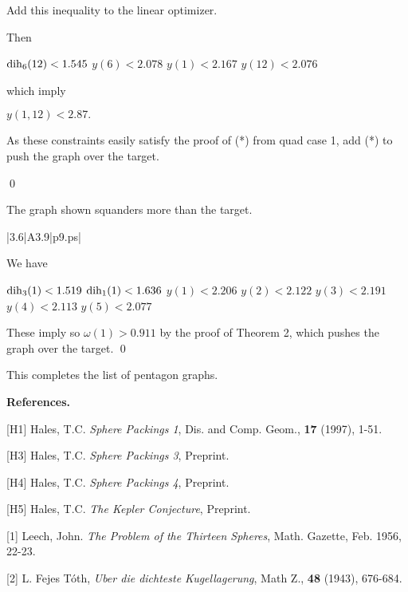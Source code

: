 Add this inequality to the linear optimizer.

Then

$\operatorname{dih}_6(12)<1.545$ \newline
$y(6)<2.078$ \newline
$y(1)<2.167$ \newline
$y(12)<2.076$ \newline

which imply

$y(1,12)<2.87.$ \newline

As these constraints easily satisfy the proof of (*) from
quad case 1, add (*) to push the graph over the target.

\qed

\bigskip

 The graph shown 
squanders more than the target.  \endproclaim

\gram|3.6|A3.9|p9.ps|  %


We have 

$\operatorname{dih}_3(1) < 1.519$ \newline
$\operatorname{dih}_1(1) < 1.636$ \newline
$y(1)<2.206$ \newline
$y(2)<2.122$ \newline
$y(3)<2.191$ \newline
$y(4)<2.113$ \newline
$y(5)<2.077$ \newline

These imply 
so $\omega(1)>0.911$ by the proof of Theorem 2, which pushes the graph over the target. \qed

\bigskip

This completes the list of pentagon graphs.


\bigskip



{\bf References.}

[H1] Hales, T.C. {\it Sphere Packings 1}, Dis. and Comp. Geom., 
{\bf 17} (1997), 1-51.

[H3] Hales, T.C. {\it Sphere Packings 3}, Preprint.

[H4] Hales, T.C. {\it Sphere Packings 4}, Preprint.

[H5] Hales, T.C. {\it The Kepler Conjecture}, Preprint.

[1] Leech, John.  {\it The Problem of the Thirteen Spheres},  Math. Gazette,  
Feb. 1956, 22-23.

[2] L. Fejes T\'oth, {\it Uber die dichteste Kugellagerung}, Math 
Z., {\bf 48} (1943), 676-684.

